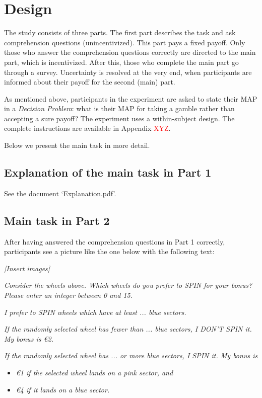 \section{Design}
The study consists of three parts.
The first part describes the task and ask comprehension questions (unincentivized).
This part pays a fixed payoff.
Only those who answer the comprehension questions correctly are directed to the main part, which is incentivized.
After this, those who complete the main part go through a survey.
Uncertainty is resolved at the very end, when participants are informed about their payoff for the second (main) part.

As mentioned above, participants in the experiment are asked to state their MAP in a \textit{Decision Problem}: what is their MAP for taking a gamble rather than accepting a sure payoff?
The experiment uses a within-subject design.
The complete instructions are available in Appendix \textcolor{red}{XYZ}.

Below we present the main task in more detail.

\subsection{Explanation of the main task in Part 1}
See the document `Explanation.pdf'.


\subsection{Main task in Part 2}
After having answered the comprehension questions in Part 1 correctly, participants see a picture like the one below with the following text:

\textit{[Insert images]}

\textit{Consider the wheels above. Which wheels do you prefer to SPIN for your bonus?
Please enter an integer between 0 and 15.}

\textit{I prefer to SPIN wheels which have at least ... blue sectors.}

\textit{If the randomly selected wheel has fewer than ... blue sectors, I DON'T SPIN it.
My bonus is \euro 2.}

\textit{If the randomly selected wheel has ... or more blue sectors, I SPIN it.
My bonus is}
\begin{itemize}
\item \textit{\euro 1 if the selected wheel lands on a pink sector, and}
\item \textit{\euro 4 if it lands on a blue sector.}
\end{itemize}

